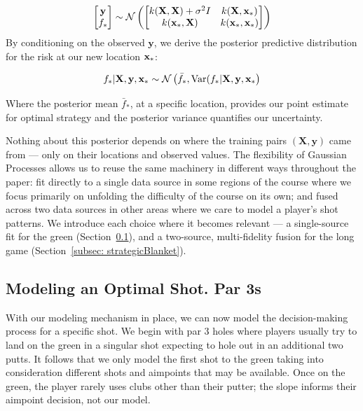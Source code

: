 \documentclass[11pt, letterpaper]{article}
\begin{document}
\begin{align*}
    \begin{bmatrix}
        \mathbf{y}\\
        f_*
    \end{bmatrix} \sim 
    \mathcal{N}\left (\begin{bmatrix}
        k(\mathbf{X},\mathbf{X}) + \sigma^2I & k(\mathbf{X},\mathbf{x}_*) \\
        k(\mathbf{x}_*, \mathbf{X}) & k(\mathbf{x}_*, \mathbf{x}_*)
    \end{bmatrix}\right)
\end{align*}
 By conditioning on the observed $\mathbf{y}$, we derive the posterior predictive distribution for the risk at our new location $\mathbf{x}_*$:

\[f_* |\mathbf{X}, \mathbf{y}, \mathbf{x}_* \sim \mathcal{N}\left(\bar f_*, \text{Var}(f_* | \mathbf{X}, \mathbf{y}, \mathbf{x}_*\right)\]

Where the posterior mean $\bar f_*$, at a specific location, provides our point estimate for optimal strategy and the posterior variance quantifies our uncertainty.

Nothing about this posterior depends on where the training pairs $(\mathbf{X}, \mathbf{y})$ came from --- only on their locations and observed values. The flexibility of Gaussian Processes allows us to reuse the same machinery in different ways throughout the paper: fit directly to a single data source in some regions of the course where we focus primarily on unfolding the difficulty of the course on its own; and fused across two data sources in other areas where we care to model a player's shot patterns. We introduce each choice where it becomes relevant --- a single-source fit for the green (Section~\ref{subsec:par3}), and a two-source, multi-fidelity fusion for the long game (Section~\ref{subsec: strategicBlanket}).

\subsection{Modeling an Optimal Shot. Par 3s}

\label{subsec:par3}

With our modeling mechanism in place, we can now model the decision-making process for a specific shot. We begin with par 3
holes where players usually try to land on the green in a singular shot expecting to hole out in an additional two putts. It follows that we only model the first shot to the green taking into consideration different shots and aimpoints that may be available. Once on the green, the player rarely uses clubs other than their putter; the slope informs their aimpoint decision, not our model. 
\end{document}
